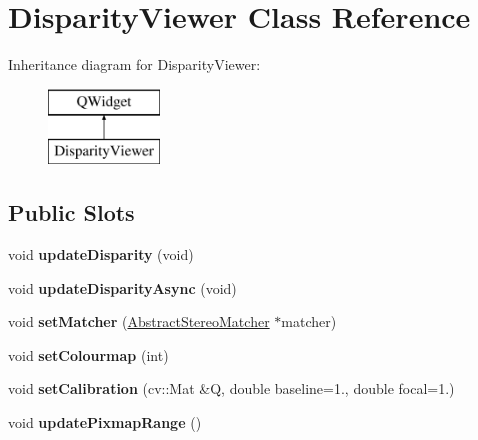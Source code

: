 \hypertarget{class_disparity_viewer}{}\section{Disparity\+Viewer Class Reference}
\label{class_disparity_viewer}
Inheritance diagram for Disparity\+Viewer\+:\begin{figure}[H]
\begin{center}
\leavevmode
\includegraphics[height=2.000000cm]{class_disparity_viewer}
\end{center}
\end{figure}
\subsection*{Public Slots}
\begin{DoxyCompactItemize}
\item 
\hypertarget{class_disparity_viewer_a2ed25874b1180e197fea72c1281750a6}{}void {\bfseries update\+Disparity} (void)\label{class_disparity_viewer_a2ed25874b1180e197fea72c1281750a6}

\item 
\hypertarget{class_disparity_viewer_a988ce413da8823c64bf190dfc359f16f}{}void {\bfseries update\+Disparity\+Async} (void)\label{class_disparity_viewer_a988ce413da8823c64bf190dfc359f16f}

\item 
\hypertarget{class_disparity_viewer_a75a907708436c6805b6318eb90d96369}{}void {\bfseries set\+Matcher} (\hyperlink{class_abstract_stereo_matcher}{Abstract\+Stereo\+Matcher} $\ast$matcher)\label{class_disparity_viewer_a75a907708436c6805b6318eb90d96369}

\item 
\hypertarget{class_disparity_viewer_a5d060a1bd1867db8938f6247e1bbdc2c}{}void {\bfseries set\+Colourmap} (int)\label{class_disparity_viewer_a5d060a1bd1867db8938f6247e1bbdc2c}

\item 
\hypertarget{class_disparity_viewer_ab4dd876b0a61d2bd7ad3054cf1b86b38}{}void {\bfseries set\+Calibration} (cv\+::\+Mat \&Q, double baseline=1., double focal=1.)\label{class_disparity_viewer_ab4dd876b0a61d2bd7ad3054cf1b86b38}

\item 
\hypertarget{class_disparity_viewer_a7f12cd7a395428fe6819ae29cec31a5d}{}void {\bfseries update\+Pixmap\+Range} ()\label{class_disparity_viewer_a7f12cd7a395428fe6819ae29cec31a5d}

\end{DoxyCompactItemize}
